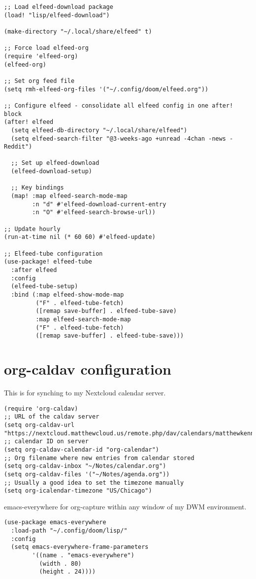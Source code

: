 \documentclass[11pt]{article}
\begin{document}
\begin{verbatim}
;; Load elfeed-download package
(load! "lisp/elfeed-download")

(make-directory "~/.local/share/elfeed" t)

;; Force load elfeed-org
(require 'elfeed-org)
(elfeed-org)

;; Set org feed file
(setq rmh-elfeed-org-files '("~/.config/doom/elfeed.org"))

;; Configure elfeed - consolidate all elfeed config in one after! block
(after! elfeed
  (setq elfeed-db-directory "~/.local/share/elfeed")
  (setq elfeed-search-filter "@3-weeks-ago +unread -4chan -news -Reddit")

  ;; Set up elfeed-download
  (elfeed-download-setup)

  ;; Key bindings
  (map! :map elfeed-search-mode-map
        :n "d" #'elfeed-download-current-entry
        :n "O" #'elfeed-search-browse-url))

;; Update hourly
(run-at-time nil (* 60 60) #'elfeed-update)

;; Elfeed-tube configuration
(use-package! elfeed-tube
  :after elfeed
  :config
  (elfeed-tube-setup)
  :bind (:map elfeed-show-mode-map
         ("F" . elfeed-tube-fetch)
         ([remap save-buffer] . elfeed-tube-save)
         :map elfeed-search-mode-map
         ("F" . elfeed-tube-fetch)
         ([remap save-buffer] . elfeed-tube-save)))
\end{verbatim}
\section{org-caldav configuration}
\label{sec:org3be2e9b}
This is for synching to my Nextcloud calendar server.
\begin{verbatim}
(require 'org-caldav)
;; URL of the caldav server
(setq org-caldav-url "https://nextcloud.matthewcloud.us/remote.php/dav/calendars/matthewkennedy")
;; calendar ID on server
(setq org-caldav-calendar-id "org-calendar")
;; Org filename where new entries from calendar stored
(setq org-caldav-inbox "~/Notes/calendar.org")
(setq org-caldav-files '("~/Notes/agenda.org"))
;; Usually a good idea to set the timezone manually
(setq org-icalendar-timezone "US/Chicago")
\end{verbatim}

emacs-everywhere for org-capture within any window of my DWM environment.
\begin{verbatim}
(use-package emacs-everywhere
  :load-path "~/.config/doom/lisp/"
  :config
  (setq emacs-everywhere-frame-parameters
        '((name . "emacs-everywhere")
          (width . 80)
          (height . 24))))
\end{verbatim}
\end{document}
